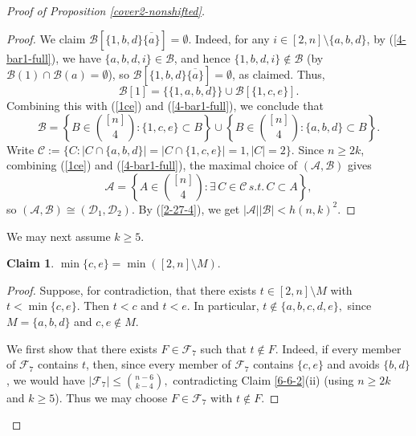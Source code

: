 \documentclass[a4paper,11pt]{article}
\newtheorem{claim}[theorem]{Claim}
\newcommand{\m}{\mathcal}
\begin{document}
\begin{proof}[Proof of Proposition \ref{cover2-nonshifted}]
\begin{proof}
We claim $\m B[\{1,b,d\}\overline{\{a\}}]=\emptyset$. Indeed, for any $i\in [2,n]\setminus \{a,b,d\}$, by (\ref{4-bar1-full}), we have $\{a,b,d,i\}\in \m B$, and hence $\{1,b,d,i\}\not\in \m B$ (by $\m B(1)\cap \m B(a)=\emptyset$), so 
$\m B[\{1,b,d\}\overline{\{a\}}]=\emptyset$, as claimed. 
Thus, 
\[
\m B[1]=\{\{1,a,b,d\}\}\cup \m B[\{1,c,e\}].
\]
Combining this with (\ref{1ce}) and (\ref{4-bar1-full}),
we conclude that
\[
\m B=\left\{B\in {[n]\choose 4}: \{1,c,e\}\subset B\right\}\cup \left\{B\in {[n]\choose 4}: \{a,b,d\}\subset B\right\}.
\]
Write $\m C:=\{C: |C\cap \{a,b,d\}|=|C\cap \{1,c,e\}|=1, |C|=2 \}$.
Since $n\ge2k$, combining (\ref{1ce}) and (\ref{4-bar1-full}), the maximal choice of $(\m A, \m B)$ gives
$$\m A=\left\{A\in {[n]\choose 4}: \exists \, C\in \m C \,s.t.\, C \subset A\right\},$$
so $(\m A, \m B)\cong(\m D_1, \m D_2)$.
By (\ref{2-27-4}), we get $|\m A||\m B|<h(n,k)^2$.
\end{proof}

We may next assume $k\ge 5$. 

\begin{claim}\label{ce-min}
$\min\{c,e\}=\min([2,n]\setminus M).$
\end{claim}

\begin{proof}
Suppose, for contradiction, that there exists $t\in [2,n]\setminus M$ with $t<\min\{c,e\}.$
Then $t<c$ and $t<e$. In particular, 
$t\notin \{a,b,c,d,e\},$
since $M=\{a,b,d\}$ and $c,e\notin M$.

We first show that there exists $F\in\mathcal F_7$ such that $t\notin F$.
Indeed, if every member of $\mathcal F_7$ contains $t$, then, since
every member of $\mathcal F_7$ contains $\{c,e\}$ and avoids $\{b,d\}$,
we would have 
$|\mathcal F_7|\le {n-6\choose k-4},$ contradicting Claim \ref{6-6-2}(ii) (using $n\ge 2k$ and $k\ge5$).
 Thus we may choose
 $F\in\mathcal F_7$ with $t\notin F.$


\end{proof}
\end{proof}
\end{document}
